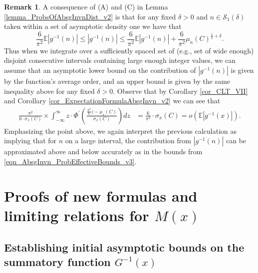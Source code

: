\documentclass[11pt,reqno,a4letter]{article}
\numberwithin{figure}{section}
\numberwithin{table}{section}
\theoremstyle{plain}
\numberwithin{theorem}{section}
\theoremstyle{definition}
\newtheorem{remark}[theorem]{Remark}
\begin{document}
\begin{remark} 
\label{remark_ProbsOfAbsgInvnDist_v3} 
A consequence of (A) and (C) in Lemma \ref{lemma_ProbsOfAbsgInvnDist_v2} 
is that for any fixed $\delta > 0$ and $n \in \mathcal{S}_1(\delta)$ 
taken within a set of asymptotic density one we have that 
\begin{equation} 
\label{eqn_AbsgInvn_ProbEffectiveBounds_v3} 
\frac{6}{\pi^2}\mathbb{E}|g^{-1}(n)| \leq |g^{-1}(n)| \leq \frac{6}{\pi^2}\mathbb{E}|g^{-1}(n)| + \frac{6}{\pi^2} 
     \mu_n(C)^{\frac{1}{2} + \delta}. 
\end{equation} 
Thus when we integrate over a sufficiently spaced set of (e.g., set of wide enough) 
disjoint consecutive intervals 
containing large enough integer values, 
we can assume that an asymptotic lower bound on the 
contribution of $|g^{-1}(n)|$ is given by the function's average 
order, and an upper bound is given by the same inequality 
above for any fixed $\delta > 0$. 
Observe that by 
Corollary \ref{cor_CLT_VII} and 
Corollary \ref{cor_ExpectationFormulaAbsgInvn_v2} 
we can see that 
\begin{align*} 
\frac{\pi^2}{6 \cdot \sigma_x(C)} \times \int_{-\infty}^{\infty} z \cdot 
     \Phi^{\prime}\left(\frac{\frac{\pi^2}{6} z - \mu_x(C)}{\sigma_x(C)}\right) dz & = 
     \frac{6}{\pi^2} \cdot \sigma_x(C) = o\left(\mathbb{E}|g^{-1}(x)|\right). 
\end{align*} 
Emphasizing the point above, 
we again interpret the previous calculation as implying that for $n$ on a large 
interval, the contribution from $|g^{-1}(n)|$ can be approximated above and below 
accurately as in the bounds from \eqref{eqn_AbsgInvn_ProbEffectiveBounds_v3}. 
\end{remark} 

\newpage 
\section{Proofs of new formulas and limiting relations for $M(x)$} 
\label{Section_KeyApplications} 

\subsection{Establishing initial asymptotic bounds on the summatory function $G^{-1}(x)$} 
\label{Section_ProofOfValidityOfAverageOrderLowerBounds} 
\end{document}
